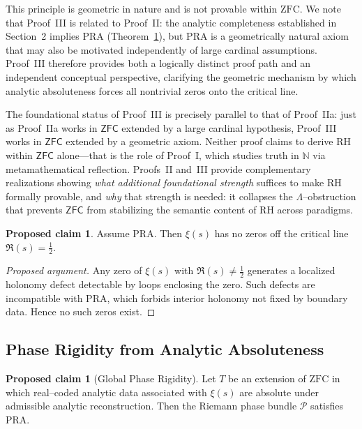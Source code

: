\documentclass{article}
\theoremstyle{definition}
\newtheorem{proposal}[theorem]{Proposed claim}
\begin{document}
This principle is geometric in nature and is not provable within $\mathrm{ZFC}$.
We note that Proof~III is related to Proof~II: the analytic completeness
established in Section~2 implies PRA (Theorem~\ref{thm:phase-rigidity-T}),
but PRA is a geometrically natural axiom that may also be motivated
independently of large cardinal assumptions. Proof~III therefore provides
both a logically distinct proof path and an independent conceptual
perspective, clarifying the geometric mechanism by which analytic
absoluteness forces all nontrivial zeros onto the critical line.

The foundational status of Proof~III is precisely parallel to that of 
Proof~IIa: just as Proof~IIa works in $\mathsf{ZFC}$ extended by a 
large cardinal hypothesis, Proof~III works in $\mathsf{ZFC}$ extended 
by a geometric axiom. Neither proof claims to derive RH within 
$\mathsf{ZFC}$ alone---that is the role of Proof~I, which studies 
truth in $\mathbb{N}$ via metamathematical reflection. Proofs~II 
and~III provide complementary realizations showing \emph{what 
additional foundational strength} suffices to make RH formally 
provable, and \emph{why} that strength is needed: it collapses the 
$\Lambda$--obstruction that prevents $\mathsf{ZFC}$ from stabilizing 
the semantic content of RH across paradigms.

\begin{proposal}
\label{thm:PRA-implies-RH}
Assume PRA. Then $\xi(s)$ has no zeros off the critical line
$\Re(s)=\tfrac12$.
\end{proposal}

\begin{proof}[Proposed argument]
Any zero of $\xi(s)$ with $\Re(s)\neq\tfrac12$ generates a localized holonomy
defect detectable by loops enclosing the zero. Such defects are incompatible
with PRA, which forbids interior holonomy not fixed by boundary data. Hence no
such zeros exist.
\end{proof}

\subsection{Phase Rigidity from Analytic Absoluteness}

\begin{proposal}[Global Phase Rigidity]
\label{thm:phase-rigidity-T}
Let $T$ be an extension of $\mathrm{ZFC}$ in which real--coded analytic data
associated with $\xi(s)$ are absolute under admissible analytic reconstruction.
Then the Riemann phase bundle $\mathcal{P}$ satisfies PRA.
\end{proposal}
\end{document}
